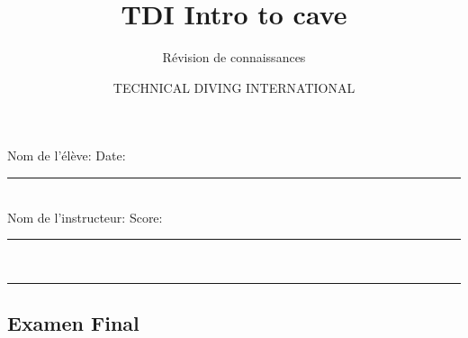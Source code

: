 \documentclass[english,10pt,a4paper]{article}
\title{TDI Intro to cave}
\subtitle{Révision de connaissances}
\author{TECHNICAL DIVING INTERNATIONAL}
\begin{document}
	

	\begin{bfseries}
		Nom de l'élève: \hrulefill \hspace{1cm} Date: \rule{2cm}{0.4pt} \vspace{0.5cm} \\
		Nom de l'instructeur:\hrulefill \hspace{1cm} Score: \rule{2cm}{0.4pt}\\
		
	\end{bfseries}
	\rule{\textwidth}{1pt}


	\begin{center}
		\section*{Examen Final}
	\end{center}
\end{document}
